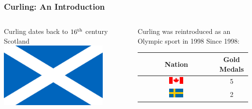 \documentclass{beamer}
\begin{document}
\begin{frame}\frametitle{Curling: An Introduction}
    \begin{columns}
        \begin{column}{0.5\textwidth}
            \begin{block}{Curling dates back to $16^{\textnormal{th}}$ century Scotland}
                \centering
                \includegraphics[width=0.8\textwidth]{Images/Scotland.png}
            \end{block}
        \end{column}
        \begin{column}{0.45\textwidth}
            \begin{block}{Curling was reintroduced as an Olympic sport in 1998}
                Since 1998:
                    \begin{table}
                        \centering
                        \begin{tabular}{cc}
                            Nation                                                          &Gold Medals\\
                            \hline
                            \includegraphics[width=0.2\textwidth]{Images/Canada.png}        &5\\
                            \includegraphics[width=0.2\textwidth]{Images/Sweden.png}        &2\\

\end{tabular}
\end{table}
\end{block}
\end{column}
\end{columns}
\end{frame}
\end{document}
